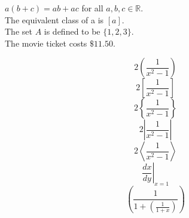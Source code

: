 \documentclass[11pt]{article}
\begin{document}
$a(b+c)=ab+ac$ for all $a,b,c \in \mathbb{R}$. \\[6pt]
The equivalent class of a is $[a]$.\\[6pt]
The set $A$ is defined to be $\{1, 2, 3\}$.\\[6pt]
The movie ticket costs $\$11.50$.

$$2\left(\frac{1}{x^2-1}\right)$$
$$2\left[\frac{1}{x^2-1}\right]$$
$$2\left\{\frac{1}{x^2-1}\right\}$$
$$2\left|\frac{1}{x^2-1}\right|$$
$$2\left\langle\frac{1}{x^2-1}\right\rangle$$
$$\left.\frac{dx}{dy}\right|_{x=1}$$
$$\left(\frac{1}{1+ \left(\frac{1}{1+x}\right)}\right)$$
\end{document}
